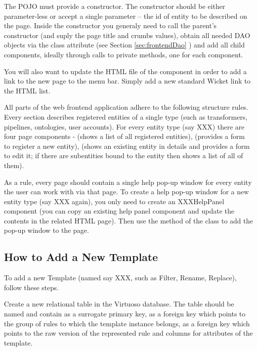 The POJO must provide a constructor. The constructor should be either parameter-less or accept a single parameter -- the id of entity to be described on the page. Inside the constructor you generaly need to call the parent's constructor (and suply the page title and crumbs values), obtain all needed DAO objects via the  class attribute (see Section \ref{sec:frontendDao} ) and add all child components, ideally through calls to private methods, one for each component.

You will also want to update the HTML file of the  component in order to add a link to the new page to the menu bar. Simply add a new standard Wicket link to the HTML list.

All parts of the web frontend application adhere to the following structure rules. Every section describes registered entities of a single type (such as transformers, pipelines, ontologies, user accounts). For every entity type (say XXX) there are four page components -  (shows a list of all registered entities),  (provides a form to register a new entity),  (shows an existing entity in details and provides a form to edit it; if there are subentities bound to the entity then shows a list of all of them).

As a rule, every page should contain a single help pop-up window for every entity the user can work with via that page. To create a help pop-up window for a new entity type (say XXX again), you only need to create an XXXHelpPanel component (you can copy an existing help panel component and update the contents in the related HTML page). Then use the  method of the  class to add the pop-up window to the page.


\subsection{How to Add a New \DN Template}

To add a new \DN Template (named say XXX, such as Filter, Rename, Replace), follow these steps.

Create a new relational table in the Virtuoso database. The table should be named  and contain  as a surrogate primary key,  as a foreign key which points to the group of rules to which the template instance belongs,  as a foreign key which points to the raw version of the represented rule and columns for attributes of the template.

